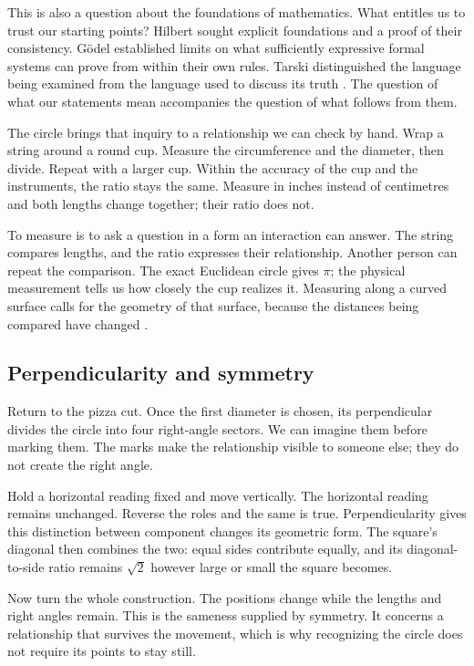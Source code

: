 \documentclass[11pt,a4paper]{article}
\theoremstyle{definition}
\begin{document}
This is also a question about the foundations of mathematics. What
entitles us to trust our starting points? Hilbert sought explicit
foundations and a proof of their consistency. G\"odel established
limits on what sufficiently expressive formal systems can prove
from within their own rules. Tarski distinguished the language being
examined from the language used to discuss its truth
\citep{Godel1931,Tarski1944,Zach2005}. The question of what our
statements mean accompanies the question of what follows from them.

The circle brings that inquiry to a relationship we can check by hand.
Wrap a string around a round cup. Measure the circumference and the
diameter, then divide. Repeat with a larger cup. Within the accuracy
of the cup and the instruments, the ratio stays the same. Measure
in inches instead of centimetres and both lengths change together;
their ratio does not.

To measure is to ask a question in a form an interaction can answer.
The string compares lengths, and the ratio expresses their
relationship. Another person can repeat the comparison. The exact
Euclidean circle gives $\pi$; the physical measurement tells us how
closely the cup realizes it. Measuring along a curved surface calls
for the geometry of that surface, because the distances being
compared have changed \citep[Vol.~II, Chapter~42]{Feynman}.

\subsection{Perpendicularity and symmetry}

Return to the pizza cut. Once the first diameter is chosen, its
perpendicular divides the circle into four right-angle sectors.
We can imagine them before marking them. The marks make the
relationship visible to someone else; they do not create the
right angle.

Hold a horizontal reading fixed and move vertically. The horizontal
reading remains unchanged. Reverse the roles and the same is true.
Perpendicularity gives this distinction between component changes
its geometric form. The square's diagonal then combines the two:
equal sides contribute equally, and its diagonal-to-side ratio
remains $\sqrt2$ however large or small the square becomes.

Now turn the whole construction. The positions change while the
lengths and right angles remain. This is the sameness supplied by
symmetry. It concerns a relationship that survives the movement,
which is why recognizing the circle does not require its points to
stay still.
\end{document}
